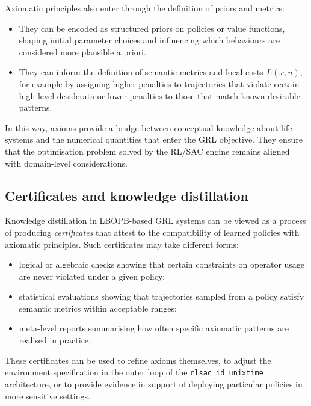 \documentclass[11pt]{book}
\theoremstyle{plain}
\theoremstyle{definition}
\theoremstyle{remark}
\begin{document}
Axiomatic principles also enter through the definition of priors and
metrics:

\begin{itemize}
  \item They can be encoded as structured priors on policies or value
        functions, shaping initial parameter choices and influencing
        which behaviours are considered more plausible a priori.
  \item They can inform the definition of semantic metrics and local
        costs $L(x,u)$, for example by assigning higher penalties to
        trajectories that violate certain high-level desiderata or
        lower penalties to those that match known desirable patterns.
\end{itemize}

In this way, axioms provide a bridge between conceptual knowledge
about life systems and the numerical quantities that enter the GRL
objective. They ensure that the optimisation problem solved by the
RL/SAC engine remains aligned with domain-level considerations.

\subsection*{Certificates and knowledge distillation}

Knowledge distillation in LBOPB-based GRL systems can be viewed as a
process of producing \emph{certificates} that attest to the
compatibility of learned policies with axiomatic principles. Such
certificates may take different forms:

\begin{itemize}
  \item logical or algebraic checks showing that certain constraints
        on operator usage are never violated under a given policy;
  \item statistical evaluations showing that trajectories sampled from
        a policy satisfy semantic metrics within acceptable ranges;
  \item meta-level reports summarising how often specific axiomatic
        patterns are realised in practice.
\end{itemize}

These certificates can be used to refine axioms themselves, to adjust
the environment specification in the outer loop of the
\texttt{rlsac\_id\_unixtime} architecture, or to provide evidence in
support of deploying particular policies in more sensitive settings.
\end{document}
